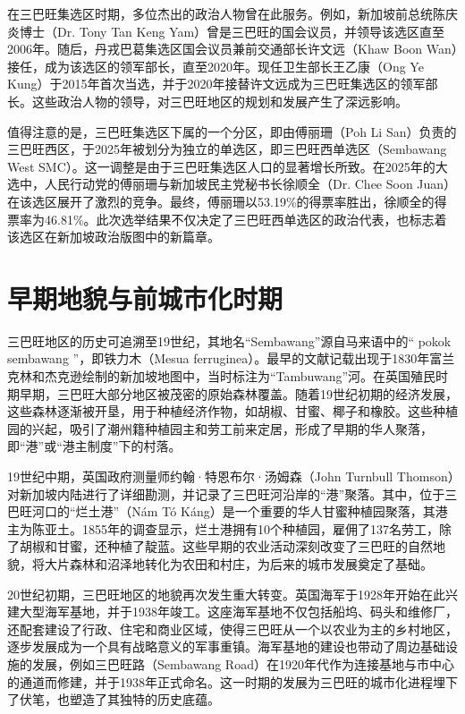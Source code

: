 \documentclass[11pt,a4paper,twoside,openany]{book}
\begin{document}
在三巴旺集选区时期，多位杰出的政治人物曾在此服务。例如，新加坡前总统陈庆炎博士（Dr. Tony Tan Keng Yam）曾是三巴旺的国会议员，并领导该选区直至2006年。随后，丹戎巴葛集选区国会议员兼前交通部长许文远（Khaw Boon Wan）接任，成为该选区的领军部长，直至2020年。现任卫生部长王乙康（Ong Ye Kung）于2015年首次当选，并于2020年接替许文远成为三巴旺集选区的领军部长。这些政治人物的领导，对三巴旺地区的规划和发展产生了深远影响。

值得注意的是，三巴旺集选区下属的一个分区，即由傅丽珊（Poh Li San）负责的三巴旺西区，于2025年被划分为独立的单选区，即三巴旺西单选区（Sembawang West SMC）。这一调整是由于三巴旺集选区人口的显著增长所致。在2025年的大选中，人民行动党的傅丽珊与新加坡民主党秘书长徐顺全（Dr. Chee Soon Juan）在该选区展开了激烈的竞争。最终，傅丽珊以53.19\%的得票率胜出，徐顺全的得票率为46.81\%。此次选举结果不仅决定了三巴旺西单选区的政治代表，也标志着该选区在新加坡政治版图中的新篇章。

\section{早期地貌与前城市化时期}
三巴旺地区的历史可追溯至19世纪，其地名“Sembawang”源自马来语中的“ pokok sembawang ”，即铁力木（Mesua ferruginea）。最早的文献记载出现于1830年富兰克林和杰克逊绘制的新加坡地图中，当时标注为“Tambuwang”河。在英国殖民时期早期，三巴旺大部分地区被茂密的原始森林覆盖。随着19世纪初期的经济发展，这些森林逐渐被开垦，用于种植经济作物，如胡椒、甘蜜、椰子和橡胶。这些种植园的兴起，吸引了潮州籍种植园主和劳工前来定居，形成了早期的华人聚落，即“港”或“港主制度”下的村落。

19世纪中期，英国政府测量师约翰·特恩布尔·汤姆森（John Turnbull Thomson）对新加坡内陆进行了详细勘测，并记录了三巴旺河沿岸的“港”聚落。其中，位于三巴旺河口的“烂土港”（Nám Tó Káng）是一个重要的华人甘蜜种植园聚落，其港主为陈亚土。1855年的调查显示，烂土港拥有10个种植园，雇佣了137名劳工，除了胡椒和甘蜜，还种植了靛蓝。这些早期的农业活动深刻改变了三巴旺的自然地貌，将大片森林和沼泽地转化为农田和村庄，为后来的城市发展奠定了基础。

20世纪初期，三巴旺地区的地貌再次发生重大转变。英国海军于1928年开始在此兴建大型海军基地，并于1938年竣工。这座海军基地不仅包括船坞、码头和维修厂，还配套建设了行政、住宅和商业区域，使得三巴旺从一个以农业为主的乡村地区，逐步发展成为一个具有战略意义的军事重镇。海军基地的建设也带动了周边基础设施的发展，例如三巴旺路（Sembawang Road）在1920年代作为连接基地与市中心的通道而修建，并于1938年正式命名。这一时期的发展为三巴旺的城市化进程埋下了伏笔，也塑造了其独特的历史底蕴。
\end{document}
